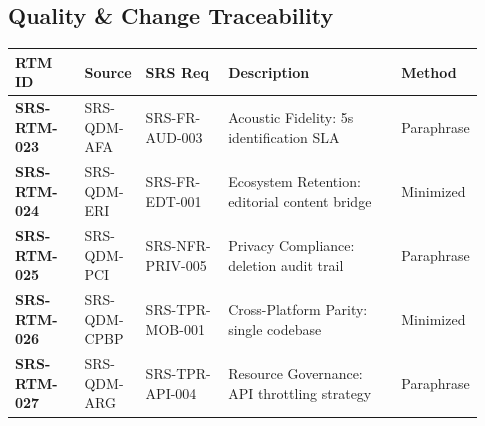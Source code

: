 \documentclass[12pt, a4paper]{article}
\begin{document}
\subsection*{Quality \& Change Traceability}

\begin{longtable}[]{@{}
  >{\raggedright\arraybackslash}p{0.15\linewidth}
  >{\raggedright\arraybackslash}p{0.12\linewidth}
  >{\raggedright\arraybackslash}p{0.18\linewidth}
  >{\raggedright\arraybackslash}p{0.38\linewidth}
  >{\raggedright\arraybackslash}p{0.10\linewidth}@{}}
\toprule
\textbf{RTM ID} & \textbf{Source} & \textbf{SRS Req} &
\textbf{Description} & \textbf{Method} \\
\midrule
\endhead
\bottomrule
\endlastfoot
\textbf{SRS-RTM-023} & SRS-QDM-AFA & SRS-FR-AUD-003 & Acoustic Fidelity: 5s identification SLA & Paraphrase \\
\textbf{SRS-RTM-024} & SRS-QDM-ERI & SRS-FR-EDT-001 & Ecosystem Retention: editorial content bridge & Minimized \\
\textbf{SRS-RTM-025} & SRS-QDM-PCI & SRS-NFR-PRIV-005 & Privacy Compliance: deletion audit trail & Paraphrase \\
\textbf{SRS-RTM-026} & SRS-QDM-CPBP & SRS-TPR-MOB-001 & Cross-Platform Parity: single codebase & Minimized \\
\textbf{SRS-RTM-027} & SRS-QDM-ARG & SRS-TPR-API-004 & Resource Governance: API throttling strategy & Paraphrase \\
\end{longtable}
\end{document}
